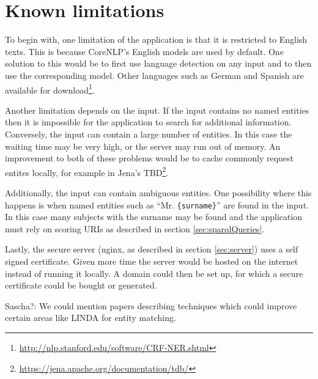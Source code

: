 \section{Known limitations}
To begin with, one limitation of the application is that it is restricted to English texts. This is because CoreNLP's English models are used by default. One solution to this would be to first use language detection on any input and to then use the corresponding model. Other languages such as German and Spanish are available for download\footnote{\url{http://nlp.stanford.edu/software/CRF-NER.shtml}}. 

Another limitation depends on the input. If the input contains no named entities then it is impossible for the application to search for additional information. Conversely, the input can contain a large number of entities. In this case the waiting time may be very high, or the server may run out of memory. An improvement to both of these problems would be to cache commonly request entites locally, for example in Jena's TBD\footnote{\url{https://jena.apache.org/documentation/tdb/}}.  

Additionally, the input can contain ambiguous entities. One possibility where this happens is when named entities such as ``Mr. \texttt{\{surname\}}'' are found in the input. In this case many subjects with the surname may be found and the application must rely on scoring URIs as described in section \ref{sec:sparqlQueries}. 

Lastly, the secure server (nginx, as described in section \ref{sec:server}) uses a self signed certificate. Given more time the server would be hosted on the internet instead of running it locally. A domain could then be set up, for which a secure certificate could be bought or generated. 




Sascha?: We could mention papers describing techniques which could improve certain areas like LINDA \cite{boehm_linda:_2012} for entity matching. 


